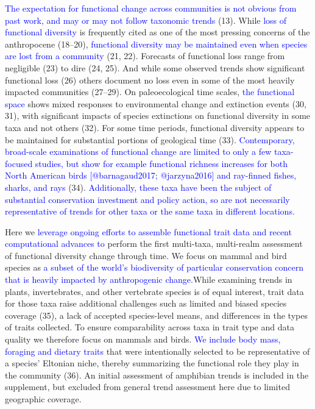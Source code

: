 \documentclass{article}
\begin{document}
\textcolor{blue}{The expectation for functional change across communities is not obvious from past work, and may or may not follow taxonomic trends}
(13). While \textcolor{blue}{loss of functional diversity} is frequently
cited as one of the most pressing concerns of the anthropocene (18--20),
\textcolor{blue}{functional diversity may be maintained even when species are lost from a community}
(21, 22). Forecasts of functional loss range from negligible (23) to
dire (24, 25). And while some observed trends show significant
functional loss (26) others document no loss even in some of the most
heavily impacted communities (27--29). On paleoecological time scales,
\textcolor{blue}{the functional space} shows mixed responses to
environmental change and extinction events (30, 31), with significant
impacts of species extinctions on functional diversity in some taxa and
not others (32). For some time periods, functional diversity appears to
be maintained for substantial portions of geological time (33).
\textcolor{blue}{Contemporary, broad-scale examinations of functional change are limited to only a few taxa-focused studies, but show for example functional richness increases for both North American birds [@barnagaud2017; @jarzyna2016] and ray-finned fishes, sharks, and rays}
(34).
\textcolor{blue}{Additionally, these taxa have been the subject of substantial conservation investment and policy action, so are not necessarily representative of trends for other taxa or the same taxa in different locations.}

Here we
\textcolor{blue}{leverage ongoing efforts to assemble functional trait data and recent computational advances to}
perform the first multi-taxa, multi-realm assessment of functional
diversity change through time. We focus on mammal and bird species as
\textcolor{blue}{a subset of the world's biodiversity of particular conservation concern that is heavily impacted by anthropogenic change.}While
examining trends in plants, invertebrates, and other vertebrate species
is of equal interest, trait data for those taxa raise additional
challenges such as limited and biased species coverage (35), a lack of
accepted species-level means, and differences in the types of traits
collected. To ensure comparability across taxa in trait type and data
quality we therefore focus on mammals and birds.
\textcolor{blue}{We include body mass, foraging and dietary traits} that
were intentionally selected to be representative of a species' Eltonian
niche, thereby summarizing the functional role they play in the
community (36). An initial assessment of amphibian trends is included in
the supplement, but excluded from general trend assessment here due to
limited geographic coverage.
\end{document}
